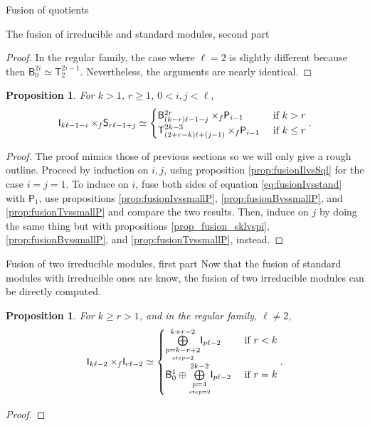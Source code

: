 \documentclass[reqno]{amsart}
\newtheorem{Prop}[Thm]{Proposition}
\newcommand{\ds}[1]{\mathsf S_{#1}}
\newcommand{\dl}[1]{\mathsf I_{#1}}
\newcommand{\dP}[1]{\mathsf P_{#1}}
\newcommand{\xf}{\times\hspace{-0.27em}_f}
\newcommand{\T}[2]{\mathsf{T}^{#1}_{#2}}
\newcommand{\B}[2]{\mathsf{B}^{#1}_{#2}}
\newcommand{\lc}{\ell}
\begin{document}
\begin{section}{Fusion of quotients}
\begin{subsection}{The fusion of irreducible and standard modules, second part}
\begin{proof}
In the regular family, the case where $\lc=2$ is slightly different because then $\B{2i}{0} \simeq \T{2i-1}{2}$. Nevertheless, the arguments are nearly identical.%
\end{proof}
\begin{Prop}\label{prop:fusionIvsstand}
For $k>1$, $r\geq 1$, $0<i,j<\lc$,
\begin{equation}\label{eq:fusionIvsstand}
\dl{k \lc-1 -i} \xf \ds{r\lc-1+j} \simeq \begin{cases}
\B{2r}{(k-r)\lc -1-j} \xf \dP{i-1} & \text{ if } k>r\\
\T{2k-3}{(2+r-k)\lc+(j-1)} \xf \dP{i-1} & \text{ if } k\leq r
\end{cases}.
\end{equation}
\end{Prop}
\begin{proof}
 The proof mimics those of previous sections so we will only give a rough outline. Proceed by induction on $i,j$, using proposition \ref{prop:fusionIlvsSql} for the case $i=j=1$. To induce on $i$, fuse both sides of equation \eqref{eq:fusionIvsstand} with $\dP{1}$, use propositions \ref{prop:fusionIvssmallP}, \ref{prop:fusionBvssmallP}, and \ref{prop:fusionTvssmallP} and compare the two results. Then, induce on $j$ by doing the same thing but with propositions \ref{prop_fusion_sklvspi}, \ref{prop:fusionBvssmallP}, and \ref{prop:fusionTvssmallP}, instead.
\end{proof}
\end{subsection}
\begin{subsection}{Fusion of two irreducible modules, first part}\label{sec:fusionIvsIp1}
Now that the fusion of standard modules with irreducible ones are know, the fusion of two irreducible modules can be directly computed.
\begin{Prop}\label{prop:fusion.IvsI1}
For $k\geq r >1$, and in the regular family, $\lc \neq 2$,
\begin{equation}
\dl{k\lc -2} \xf \dl{r \lc -2} \simeq \begin{cases}
\overset{k+r-2}{\underset{\underset{step=2}{p=k-r+2}}{\bigoplus}}\dl{p \lc -2} & \text{ if } r < k \\
\B{1}{0} \oplus \overset{2k-2}{\underset{\underset{step=2}{p=4}}{\bigoplus}}\dl{p \lc -2} & \text{ if } r=k
\end{cases}.
\end{equation}
\end{Prop}
\begin{proof}

\end{proof}
\end{subsection}
\end{section}
\end{document}

